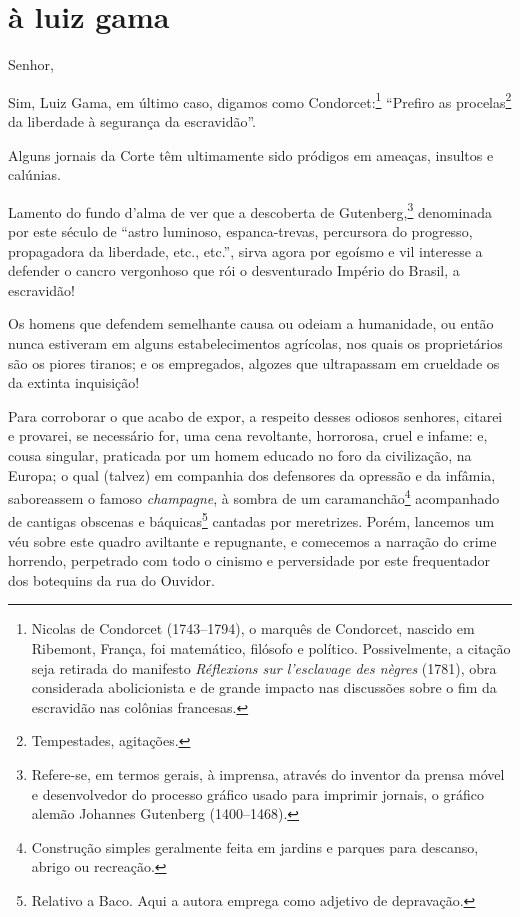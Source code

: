 {\section*{à luiz gama}

\noindent{}Senhor,%


Sim, Luiz Gama, em último caso, digamos como Condorcet:\footnote{
  Nicolas de Condorcet (1743--1794), o marquês de Condorcet, nascido em
  Ribemont, França, foi matemático, filósofo e político. Possivelmente,
  a citação seja retirada do manifesto \emph{Réflexions sur l'esclavage des nègres} (1781), obra considerada abolicionista e de grande impacto
  nas discussões sobre o fim da escravidão nas colônias francesas.}
``Prefiro as procelas\footnote{Tempestades, agitações.} da liberdade à
segurança da escravidão''.

Alguns jornais da Corte têm ultimamente sido pródigos em ameaças,
insultos e calúnias.

Lamento do fundo d'alma de ver que a descoberta de Gutenberg,\footnote{
  Refere-se, em termos gerais, à imprensa, através do inventor da prensa
  móvel e desenvolvedor do processo gráfico usado para imprimir jornais,
  o gráfico alemão Johannes Gutenberg (1400--1468).} denominada por este
século de ``astro luminoso, espanca-trevas, percursora do progresso,
propagadora da liberdade, etc., etc.'', sirva agora por egoísmo e vil
interesse a defender o cancro vergonhoso que rói o desventurado Império
do Brasil, a escravidão!

Os homens que defendem semelhante causa ou odeiam a humanidade, ou então
nunca estiveram em alguns estabelecimentos agrícolas, nos quais os
proprietários são os piores tiranos; e os empregados, algozes que
ultrapassam em crueldade os da extinta inquisição!

Para corroborar o que acabo de expor, a respeito desses odiosos
senhores, citarei e provarei, se necessário for, uma cena revoltante,
horrorosa, cruel e infame: e, cousa singular, praticada por um homem
educado no foro da civilização, na Europa; o qual (talvez) em companhia
dos defensores da opressão e da infâmia, saboreassem o famoso
\emph{champagne}, à sombra de um caramanchão\footnote{Construção
  simples geralmente feita em jardins e parques para descanso, abrigo ou
  recreação.} acompanhado de cantigas obscenas e báquicas\footnote{
  Relativo a Baco. Aqui a autora emprega como adjetivo de depravação.} 
cantadas por meretrizes. Porém, lancemos um véu sobre este quadro
aviltante e repugnante, e comecemos a narração do crime horrendo,
perpetrado com todo o cinismo e perversidade por este frequentador dos
botequins da rua do Ouvidor.

}
